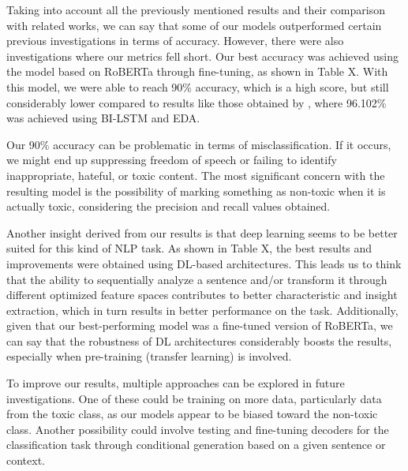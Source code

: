 Taking into account all the previously mentioned results and their comparison with related works, we can say that some of our models outperformed certain previous investigations in terms of accuracy. However, there were also investigations where our metrics fell short. Our best accuracy was achieved using the model based on RoBERTa through fine-tuning, as shown in Table X. With this model, we were able to reach 90\% accuracy, which is a high score, but still considerably lower compared to results like those obtained by \citep{fieri2023offensive}, where 96.102\% was achieved using BI-LSTM and EDA.

Our 90\% accuracy can be problematic in terms of misclassification. If it occurs, we might end up suppressing freedom of speech or failing to identify inappropriate, hateful, or toxic content. The most significant concern with the resulting model is the possibility of marking something as non-toxic when it is actually toxic, considering the precision and recall values obtained.

Another insight derived from our results is that deep learning seems to be better suited for this kind of NLP task. As shown in Table X, the best results and improvements were obtained using DL-based architectures. This leads us to think that the ability to sequentially analyze a sentence and/or transform it through different optimized feature spaces contributes to better characteristic and insight extraction, which in turn results in better performance on the task. Additionally, given that our best-performing model was a fine-tuned version of RoBERTa, we can say that the robustness of DL architectures considerably boosts the results, especially when pre-training (transfer learning) is involved.

To improve our results, multiple approaches can be explored in future investigations. One of these could be training on more data, particularly data from the toxic class, as our models appear to be biased toward the non-toxic class. Another possibility could involve testing and fine-tuning decoders for the classification task through conditional generation based on a given sentence or context.